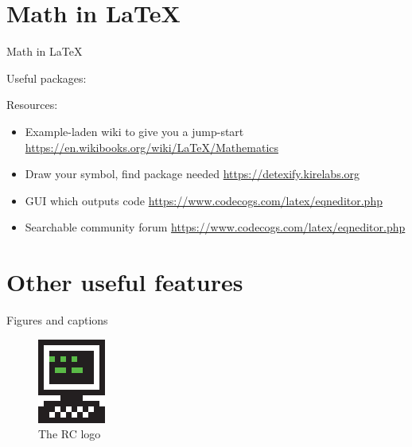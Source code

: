 \documentclass[xcolor={dvipsnames}]{beamer}
\begin{document}
\section{Math in \LaTeX}
\begin{frame}{Math in \LaTeX}
\begin{block}{Useful packages:}
\end{block}

\vfill

Resources:
\begin{itemize}
\item Example-laden wiki to give you a jump-start \url{https://en.wikibooks.org/wiki/LaTeX/Mathematics}
\item Draw your symbol, find package needed \url{https://detexify.kirelabs.org}
\item GUI which outputs code \url{https://www.codecogs.com/latex/eqneditor.php}
\item Searchable community forum \url{https://www.codecogs.com/latex/eqneditor.php}
\end{itemize}

\end{frame}

\section{Other useful features}
\begin{frame}{Figures and captions}

\begin{figure}
\includegraphics[scale=1.5]{rc-logo}
\caption{The RC logo}
\end{figure}
\end{frame}
\end{document}
